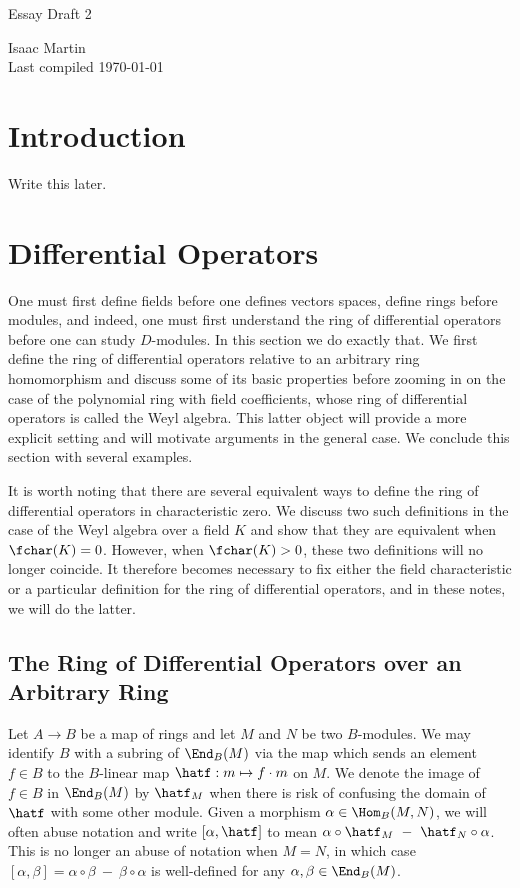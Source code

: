 
\usepackage{indentfirst}

\begin{center}
	\Large
	\begin{LARGE}
		Essay Draft 2 \\
	\end{LARGE}
	Isaac Martin \\
    Last compiled \today
\end{center}
\normalsize
\vspace{-2mm}
\hru

\tableofcontents
\newpage
\section*{Introduction}
Write this later.

\newpage
\section{Differential Operators}
One must first define fields before one defines vectors spaces, define rings before modules, and indeed, one must first understand the ring of differential operators before one can study $D$-modules. In this section we do exactly that. We first define the ring of differential operators relative to an arbitrary ring homomorphism and discuss some of its basic properties before zooming in on the case of the polynomial ring with field coefficients, whose ring of differential operators is called the Weyl algebra. This latter object will provide a more explicit setting and will motivate arguments in the general case. We conclude this section with several examples.

It is worth noting that there are several equivalent ways to define the ring of differential operators in characteristic zero. We discuss two such definitions in the case of the Weyl algebra over a field $K$ and show that they are equivalent when $\fchar(K) = 0$. However, when $\fchar(K) > 0$, these two definitions will no longer coincide. It therefore becomes necessary to fix either the field characteristic or a particular definition for the ring of differential operators, and in these notes, we will do the latter.

\subsection{The Ring of Differential Operators over an Arbitrary Ring}
Let $A\to B$ be a map of rings and let $M$ and $N$ be two $B$-modules. We may identify $B$ with a subring of $\End_B(M)$ via the map which sends an element $f \in B$ to the $B$-linear map $\hatf:m\mapsto f\cdot m$ on $M$. We denote the image of $f \in B$ in $\End_B(M)$ by $\hatf_M$ when there is risk of confusing the domain of $\hatf$ with some other module. Given a morphism $\alpha \in \Hom_B(M,N)$, we will often abuse notation and write $[\alpha, \hatf]$ to mean $\alpha \circ \hatf_M ~-~ \hatf_N\circ \alpha$. This is no longer an abuse of notation when $M = N$, in which case $[\alpha,\beta] = \alpha \circ \beta ~-~ \beta\circ\alpha$ is well-defined for any $\alpha, \beta \in \End_B(M)$.


